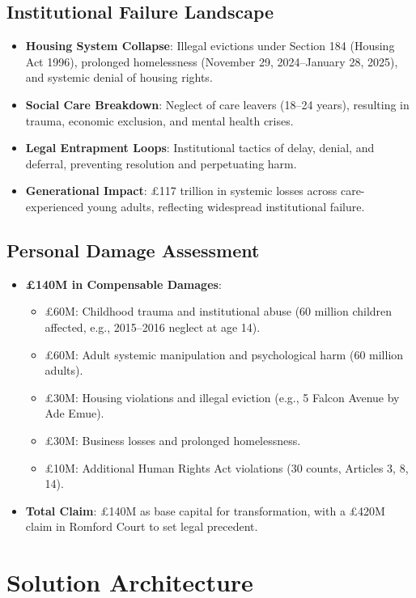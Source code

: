 \documentclass[12pt]{article}\usepackage[a4paper,margin=1in]{geometry}
\begin{document}
\subsection*{Institutional Failure Landscape}
\begin{itemize}
    \item \textbf{Housing System Collapse}: Illegal evictions under Section 184 (Housing Act 1996), prolonged homelessness (November 29, 2024--January 28, 2025), and systemic denial of housing rights.
    \item \textbf{Social Care Breakdown}: Neglect of care leavers (18--24 years), resulting in trauma, economic exclusion, and mental health crises.
    \item \textbf{Legal Entrapment Loops}: Institutional tactics of delay, denial, and deferral, preventing resolution and perpetuating harm.
    \item \textbf{Generational Impact}: £117 trillion in systemic losses across care-experienced young adults, reflecting widespread institutional failure.
\end{itemize}\subsection*{Personal Damage Assessment}
\begin{itemize}
    \item \textbf{£140M in Compensable Damages}:
        \begin{itemize}
            \item £60M: Childhood trauma and institutional abuse (60 million children affected, e.g., 2015--2016 neglect at age 14).
            \item £60M: Adult systemic manipulation and psychological harm (60 million adults).
            \item £30M: Housing violations and illegal eviction (e.g., 5 Falcon Avenue by Ade Emue).
            \item £30M: Business losses and prolonged homelessness.
            \item £10M: Additional Human Rights Act violations (30 counts, Articles 3, 8, 14).
        \end{itemize}
    \item \textbf{Total Claim}: £140M as base capital for transformation, with a £420M claim in Romford Court to set legal precedent.
\end{itemize}\section*{Solution Architecture}
\end{document}
